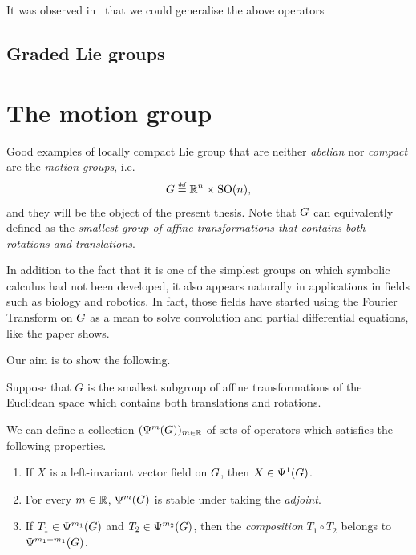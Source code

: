 It was observed in~\cite{RuzhanskyTurunen10}
that we could generalise the above operators

\subsection{Graded Lie groups}

\section{The motion group}

Good examples of locally compact Lie group that are neither \emph{abelian} nor \emph{compact} are the \emph{motion groups}, i.e.
\begin{align*}
    \Group \defeq \R^n \ltimes \SpecialOrthogonalGroup n,
\end{align*}
and they will be the object of the present thesis.
Note that $G$ can equivalently defined as the \emph{smallest group of affine transformations that contains both rotations and translations}.

In addition to the fact that it is one of the simplest groups on which symbolic calculus had not been developed,
it also appears naturally in applications in fields such as biology and robotics.
In fact, those fields have started using the Fourier Transform on $G$ as a mean to solve convolution and partial differential equations,
like the paper \cite{ChirikjianKyatkin00} shows.

Our aim is to show the following.

\begin{theorem}
    Suppose that $G$ is the smallest subgroup of affine transformations of the Euclidean space
    which contains both translations and rotations.

    We can define a collection $(\Psi^{m}_{}(G))_{m \in \mathbb{R}}$
    of sets of operators
    which satisfies the following properties.
    \begin{enumerate}
        \item If $X$ is a left-invariant vector field on $G$,
            then $X \in \Psi^{1}_{}(G)$.
        \item For every $m \in \mathbb{R}$, $\Psi^{m}_{}(G)$ is stable under taking the \emph{adjoint}.
        \item If $T_1 \in \Psi^{m_1}_{}(G)$ and $T_2 \in \Psi^{m_2}_{}(G)$, then the \emph{composition} $T_1 \circ T_2$ belongs to $\Psi^{m_1 + m_1}_{}(G)$.
    \end{enumerate}
\end{theorem}
